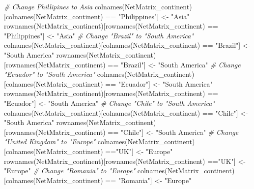 \documentclass[
]{article}
\newenvironment{Shaded}{\begin{snugshade}}{\end{snugshade}}
\newcommand{\CommentTok}[1]{\textcolor[rgb]{0.56,0.35,0.01}{\textit{#1}}}
\newcommand{\FunctionTok}[1]{\textcolor[rgb]{0.00,0.00,0.00}{#1}}
\newcommand{\NormalTok}[1]{#1}
\newcommand{\OtherTok}[1]{\textcolor[rgb]{0.56,0.35,0.01}{#1}}
\newcommand{\SpecialCharTok}[1]{\textcolor[rgb]{0.00,0.00,0.00}{#1}}
\newcommand{\StringTok}[1]{\textcolor[rgb]{0.31,0.60,0.02}{#1}}
\begin{document}
\begin{Shaded}
\begin{Highlighting}[]
\CommentTok{\# Change Phillipines to Asia}
\FunctionTok{colnames}\NormalTok{(NetMatrix\_continent)[}\FunctionTok{colnames}\NormalTok{(NetMatrix\_continent) }\SpecialCharTok{==} \StringTok{"Philippines"}\NormalTok{] }\OtherTok{\textless{}{-}} \StringTok{"Asia"}
\FunctionTok{rownames}\NormalTok{(NetMatrix\_continent)[}\FunctionTok{rownames}\NormalTok{(NetMatrix\_continent) }\SpecialCharTok{==} \StringTok{"Philippines"}\NormalTok{] }\OtherTok{\textless{}{-}} \StringTok{"Asia"}
\CommentTok{\# Change "Brazil" to "South America"}
\FunctionTok{colnames}\NormalTok{(NetMatrix\_continent)[}\FunctionTok{colnames}\NormalTok{(NetMatrix\_continent) }\SpecialCharTok{==} \StringTok{"Brazil"}\NormalTok{] }\OtherTok{\textless{}{-}} \StringTok{"South America"}
\FunctionTok{rownames}\NormalTok{(NetMatrix\_continent)[}\FunctionTok{rownames}\NormalTok{(NetMatrix\_continent) }\SpecialCharTok{==} \StringTok{"Brazil"}\NormalTok{] }\OtherTok{\textless{}{-}} \StringTok{"South America"}
\CommentTok{\# Change "Ecuador" to "South America"}
\FunctionTok{colnames}\NormalTok{(NetMatrix\_continent)[}\FunctionTok{colnames}\NormalTok{(NetMatrix\_continent) }\SpecialCharTok{==} \StringTok{"Ecuador"}\NormalTok{] }\OtherTok{\textless{}{-}} \StringTok{"South America"}
\FunctionTok{rownames}\NormalTok{(NetMatrix\_continent)[}\FunctionTok{rownames}\NormalTok{(NetMatrix\_continent) }\SpecialCharTok{==} \StringTok{"Ecuador"}\NormalTok{] }\OtherTok{\textless{}{-}} \StringTok{"South America"}
\CommentTok{\# Change "Chile" to "South America"}
\FunctionTok{colnames}\NormalTok{(NetMatrix\_continent)[}\FunctionTok{colnames}\NormalTok{(NetMatrix\_continent) }\SpecialCharTok{==} \StringTok{"Chile"}\NormalTok{] }\OtherTok{\textless{}{-}} \StringTok{"South America"}
\FunctionTok{rownames}\NormalTok{(NetMatrix\_continent)[}\FunctionTok{rownames}\NormalTok{(NetMatrix\_continent) }\SpecialCharTok{==} \StringTok{"Chile"}\NormalTok{] }\OtherTok{\textless{}{-}} \StringTok{"South America"}
\CommentTok{\# Change "United Kingdom" to "Europe" }
\FunctionTok{colnames}\NormalTok{(NetMatrix\_continent)[}\FunctionTok{colnames}\NormalTok{(NetMatrix\_continent) }\SpecialCharTok{==}\StringTok{"UK"}\NormalTok{] }\OtherTok{\textless{}{-}} \StringTok{"Europe"}
\FunctionTok{rownames}\NormalTok{(NetMatrix\_continent)[}\FunctionTok{rownames}\NormalTok{(NetMatrix\_continent) }\SpecialCharTok{==}\StringTok{"UK"}\NormalTok{] }\OtherTok{\textless{}{-}} \StringTok{"Europe"}
\CommentTok{\# Change "Romania" to "Europe"}
\FunctionTok{colnames}\NormalTok{(NetMatrix\_continent)[}\FunctionTok{colnames}\NormalTok{(NetMatrix\_continent) }\SpecialCharTok{==} \StringTok{"Romania"}\NormalTok{] }\OtherTok{\textless{}{-}} \StringTok{"Europe"}

\end{Highlighting}
\end{Shaded}
\end{document}
